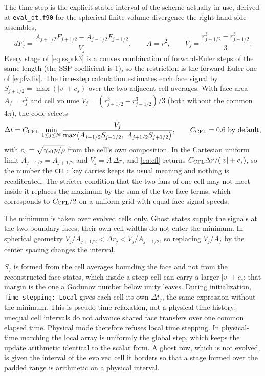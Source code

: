 The time step is the explicit-stable interval of the scheme actually in use,
derived at \texttt{eval\_dt.f90} for the spherical finite-volume divergence
the right-hand side assembles,
%
\begin{equation}
  dF_j = \frac{A_{j+1/2}F_{j+1/2} - A_{j-1/2}F_{j-1/2}}{V_j},
  \qquad A = r^2, \qquad
  V_j = \frac{r_{j+1/2}^3 - r_{j-1/2}^3}{3}.
  \label{eq:fvdiv}
\end{equation}
%
Every stage of \eqref{eq:ssprk3} is a convex combination of forward-Euler
steps of the same length (the SSP coefficient is 1), so the restriction is
the forward-Euler one of \eqref{eq:fvdiv}.  The time-step calculation estimates each face signal by
$S_{j+1/2}=\max(|v|+c_s)$ over the two adjacent cell averages.
With face area $A_f=r_f^2$ and cell volume
$V_j=(r_{j+1/2}^3-r_{j-1/2}^3)/3$ (both without the common $4\pi$),
the code selects
%
\begin{equation}
  \Delta t = C_{\rm CFL}\,\min_{1\le j\le N}
  \frac{V_j}{\max\bigl(A_{j-1/2}S_{j-1/2},\ A_{j+1/2}S_{j+1/2}\bigr)},
  \qquad C_{\rm CFL} = 0.6 \ \text{by default},
  \label{eq:cfl}
\end{equation}
%
with $c_s = \sqrt{\gamma_{\rm eff}p/\rho}$ from the cell's own composition.
In the Cartesian uniform limit $A_{j-1/2}=A_{j+1/2}$ and $V_j = A\,\Delta r$,
and \eqref{eq:cfl} returns $C_{\rm CFL}\Delta r/(|v|+c_s)$, so the number the
\texttt{CFL:} key carries keeps its usual meaning and nothing is
recalibrated.  The stricter condition that the two fans of one cell may not
meet inside it replaces the maximum by the sum of the two face terms, which
corresponds to $C_{\rm CFL}/2$ on a uniform grid with equal face signal
speeds.

The minimum is taken over evolved cells only. Ghost states supply the
signals at the two boundary faces; their own cell widths do not enter the
minimum. In spherical geometry $V_j/A_{j+1/2}<\Delta r_j<V_j/A_{j-1/2}$,
so replacing $V_j/A_f$ by the center spacing changes the interval.

$S_f$ is formed from the cell averages bounding the face and not from the
reconstructed face states, which inside a steep cell can carry a larger
$|v|+c_s$; that margin is the one a Godunov number below unity leaves.
During initialization, \texttt{Time stepping: Local} gives each cell its own
$\Delta t_j$, the same expression without the minimum. This is pseudo-time
relaxation, not a physical time history: unequal cell intervals do not
advance shared face transfers over one common elapsed time. Physical mode
therefore refuses local time stepping.  In physical-time marching the local array is
uniformly the global step, which keeps the update arithmetic identical to the
scalar form.  A ghost row, which is not evolved, is given the interval of the
evolved cell it borders so that a stage formed over the padded range is
arithmetic on a physical interval.

